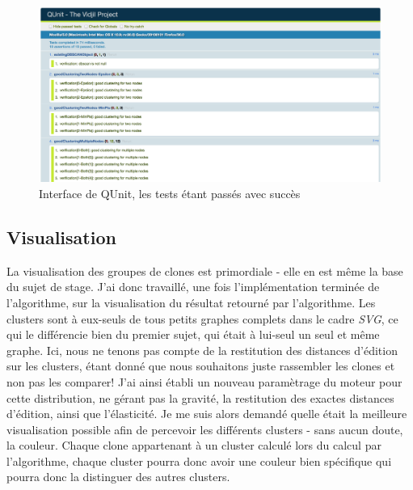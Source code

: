 \documentclass[pdftex,12pt,a4paper]{report}
\begin{document}
\begin{spacing}{1.2}
\begin{figure}[H]
\begin{center}
	\includegraphics[scale=0.35]{img/QUnit.jpg}
\end{center}
\caption{Interface de QUnit, les tests étant passés avec succès}
\label{fig:qunit}
\end{figure}

\subsection{Visualisation}

La visualisation des groupes de clones est primordiale - elle en est même la base du sujet de stage. J'ai donc travaillé, une fois l'implémentation terminée de l'algorithme, sur la visualisation du résultat retourné par l'algorithme. Les clusters sont à eux-seuls de tous petits graphes complets dans le cadre \textit{SVG}, ce qui le différencie bien du premier sujet, qui était à lui-seul un seul et même graphe. Ici, nous ne tenons pas compte de la restitution des distances d'édition sur les clusters, étant donné que nous souhaitons juste rassembler les clones et non pas les comparer! J'ai ainsi établi un nouveau paramètrage du moteur pour cette distribution, ne gérant pas la gravité, la restitution des exactes distances d'édition, ainsi que l'élasticité.
\newline
Je me suis alors demandé quelle était la meilleure visualisation possible afin de percevoir les différents clusters - sans aucun doute, la couleur. Chaque clone appartenant à un cluster calculé lors du calcul par l'algorithme, chaque cluster pourra donc avoir une couleur bien spécifique qui pourra donc la distinguer des autres clusters.


\end{spacing}
\end{document}
